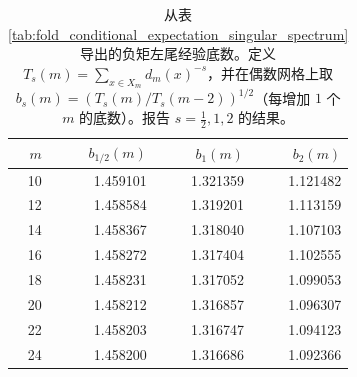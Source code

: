 \begin{table}[H]
\centering
\scriptsize
\setlength{\tabcolsep}{6pt}
\caption{从表 \ref{tab:fold_conditional_expectation_singular_spectrum} 导出的负矩左尾经验底数。定义 $T_s(m)=\sum_{x\in X_m}d_m(x)^{-s}$，并在偶数网格上取 $b_s(m)=(T_s(m)/T_s(m-2))^{1/2}$（每增加 $1$ 个 $m$ 的底数）。报告 $s=\tfrac12,1,2$ 的结果。}
\label{tab:fold_conditional_expectation_left_tail_bases}
\begin{tabular}{r r r r}
\toprule
$m$ & $b_{1/2}(m)$ & $b_{1}(m)$ & $b_{2}(m)$\\
\midrule
10 & 1.459101 & 1.321359 & 1.121482\\
12 & 1.458584 & 1.319201 & 1.113159\\
14 & 1.458367 & 1.318040 & 1.107103\\
16 & 1.458272 & 1.317404 & 1.102555\\
18 & 1.458231 & 1.317052 & 1.099053\\
20 & 1.458212 & 1.316857 & 1.096307\\
22 & 1.458203 & 1.316747 & 1.094123\\
24 & 1.458200 & 1.316686 & 1.092366\\
\bottomrule
\end{tabular}
\end{table}
